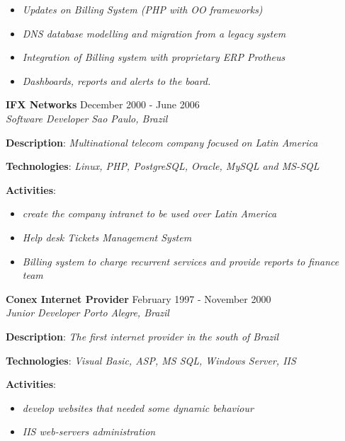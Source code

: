 \documentclass[margin]{res}
\begin{document}
\begin{resume}
\begin{description}
{\begin{itemize}
              \item{\textit{Updates on Billing System (PHP with OO frameworks)}}
              \item{\textit{DNS database modelling and migration from a legacy system}}
              \item{\textit{Integration of Billing system with proprietary ERP Protheus}}
              \item{\textit{Dashboards, reports and alerts to the board.}}
            \end{itemize}
    }
      \end{description}
    \textbf{IFX Networks} \hfill {December 2000 - June 2006}\\
  \textit{Software Developer} \hfill \textit{Sao Paulo, Brazil}\\
  \begin{description}
    \item{\textbf{Description}: \textit{Multinational telecom company focused on Latin America}}
    \item{\textbf{Technologies}: \textit{Linux, PHP, PostgreSQL, Oracle, MySQL and MS-SQL}}
    \item{
      \textbf{Activities}:
      \begin{itemize}
              \item{\textit{create the company intranet to be used over Latin America}}
              \item{\textit{Help desk Tickets Management System}}
              \item{\textit{Billing system to charge recurrent services and provide reports to finance team}}
            \end{itemize}
    }
      \end{description}
    \textbf{Conex Internet Provider} \hfill {February 1997 - November 2000}\\
  \textit{Junior Developer} \hfill \textit{Porto Alegre, Brazil}\\
  \begin{description}
    \item{\textbf{Description}: \textit{The first internet provider in the south of Brazil}}
    \item{\textbf{Technologies}: \textit{Visual Basic, ASP, MS SQL, Windows Server, IIS}}
    \item{
      \textbf{Activities}:
      \begin{itemize}
              \item{\textit{develop websites that needed some dynamic behaviour}}
              \item{\textit{IIS web-servers administration}}
            \end{itemize}
    }
      \end{description}
  

\end{resume}
\end{document}
